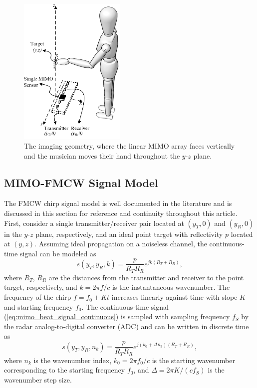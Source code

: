 \documentclass[10pt,journal,final]{IEEEtran}
\begin{document}
\begin{figure}[h]
	\centering
	\includegraphics[width=2in]{smith1.png}
	\caption{The imaging geometry, where the linear MIMO array faces vertically and the musician moves their hand throughout the $y$-$z$ plane.}
	\label{fig:MIMO_radar_musical_instrument_setup}
\end{figure} 

\subsection{MIMO-FMCW Signal Model}
\label{subsec:signal_model}
The FMCW chirp signal model is well documented in the literature \cite{rao2017intro,smith2020nearfieldisar,yanik2019sparse} and is discussed in this section for reference and continuity throughout this article.
First, consider a single transmitter/receiver pair located at $(y_T,0)$ and $(y_R,0)$ in the $y$-$z$ plane, respectively, and an ideal point target with reflectivity $p$ located at $(y,z)$.
Assuming ideal propagation on a noiseless channel, the continuous-time signal can be modeled as
\begin{equation}
\label{eq:mimo_beat_signal_continuous}
    s(y_T,y_R,k) = \frac{p}{R_T R_R} e^{jk(R_T + R_R)},
\end{equation}
where $R_T$, $R_R$ are the distances from the transmitter and receiver to the point target, respectively, and $k = 2\pi f/c$ is the instantaneous wavenumber.
The frequency of the chirp $f = f_0 + Kt$ increases linearly against time with slope $K$ and starting frequency $f_0$.
The continuous-time signal (\ref{eq:mimo_beat_signal_continuous}) is sampled with sampling frequency $f_S$ by the radar analog-to-digital converter (ADC) and can be written in discrete time as
\begin{equation}
	\label{eq:mimo_beat_signal}
	s(y_T,y_R,n_k) = \frac{p}{R_T R_R} e^{j(k_0 + \Delta n_k)(R_T + R_R)},
\end{equation}
where $n_k$ is the wavenumber index, $k_0 = 2\pi f_0/c$ is the starting wavenumber corresponding to the starting frequency $f_0$, and $\Delta = 2\pi K /(c f_S)$ is the wavenumber step size.
\end{document}
